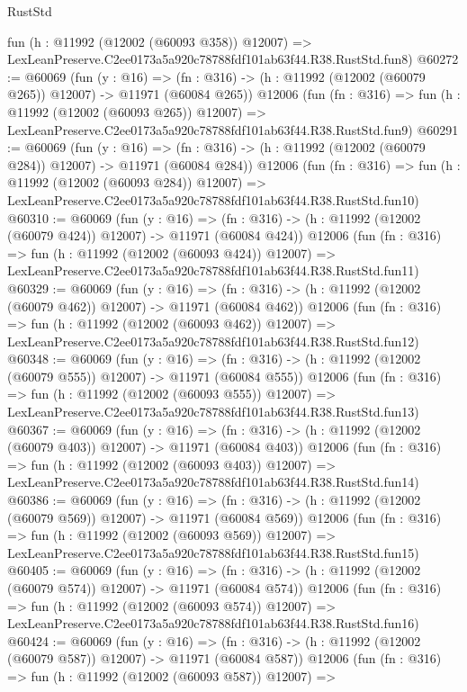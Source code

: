 \begin{lexlean}{RustStd}
\begin{coremodule}
    fun (h : @11992 (@12002 (@60093 @358)) @12007) =>
    LexLeanPreserve.C2ee0173a5a920c78788fdf101ab63f44.R38.RustStd.fun8)
@60272 := @60069
    (fun (y : @16) =>
    (fn : @316) -> (h : @11992 (@12002 (@60079 @265)) @12007) -> @11971 (@60084 @265))
    @12006
    (fun (fn : @316) =>
    fun (h : @11992 (@12002 (@60093 @265)) @12007) =>
    LexLeanPreserve.C2ee0173a5a920c78788fdf101ab63f44.R38.RustStd.fun9)
@60291 := @60069
    (fun (y : @16) =>
    (fn : @316) -> (h : @11992 (@12002 (@60079 @284)) @12007) -> @11971 (@60084 @284))
    @12006
    (fun (fn : @316) =>
    fun (h : @11992 (@12002 (@60093 @284)) @12007) =>
    LexLeanPreserve.C2ee0173a5a920c78788fdf101ab63f44.R38.RustStd.fun10)
@60310 := @60069
    (fun (y : @16) =>
    (fn : @316) -> (h : @11992 (@12002 (@60079 @424)) @12007) -> @11971 (@60084 @424))
    @12006
    (fun (fn : @316) =>
    fun (h : @11992 (@12002 (@60093 @424)) @12007) =>
    LexLeanPreserve.C2ee0173a5a920c78788fdf101ab63f44.R38.RustStd.fun11)
@60329 := @60069
    (fun (y : @16) =>
    (fn : @316) -> (h : @11992 (@12002 (@60079 @462)) @12007) -> @11971 (@60084 @462))
    @12006
    (fun (fn : @316) =>
    fun (h : @11992 (@12002 (@60093 @462)) @12007) =>
    LexLeanPreserve.C2ee0173a5a920c78788fdf101ab63f44.R38.RustStd.fun12)
@60348 := @60069
    (fun (y : @16) =>
    (fn : @316) -> (h : @11992 (@12002 (@60079 @555)) @12007) -> @11971 (@60084 @555))
    @12006
    (fun (fn : @316) =>
    fun (h : @11992 (@12002 (@60093 @555)) @12007) =>
    LexLeanPreserve.C2ee0173a5a920c78788fdf101ab63f44.R38.RustStd.fun13)
@60367 := @60069
    (fun (y : @16) =>
    (fn : @316) -> (h : @11992 (@12002 (@60079 @403)) @12007) -> @11971 (@60084 @403))
    @12006
    (fun (fn : @316) =>
    fun (h : @11992 (@12002 (@60093 @403)) @12007) =>
    LexLeanPreserve.C2ee0173a5a920c78788fdf101ab63f44.R38.RustStd.fun14)
@60386 := @60069
    (fun (y : @16) =>
    (fn : @316) -> (h : @11992 (@12002 (@60079 @569)) @12007) -> @11971 (@60084 @569))
    @12006
    (fun (fn : @316) =>
    fun (h : @11992 (@12002 (@60093 @569)) @12007) =>
    LexLeanPreserve.C2ee0173a5a920c78788fdf101ab63f44.R38.RustStd.fun15)
@60405 := @60069
    (fun (y : @16) =>
    (fn : @316) -> (h : @11992 (@12002 (@60079 @574)) @12007) -> @11971 (@60084 @574))
    @12006
    (fun (fn : @316) =>
    fun (h : @11992 (@12002 (@60093 @574)) @12007) =>
    LexLeanPreserve.C2ee0173a5a920c78788fdf101ab63f44.R38.RustStd.fun16)
@60424 := @60069
    (fun (y : @16) =>
    (fn : @316) -> (h : @11992 (@12002 (@60079 @587)) @12007) -> @11971 (@60084 @587))
    @12006
    (fun (fn : @316) =>
    fun (h : @11992 (@12002 (@60093 @587)) @12007) =>

\end{coremodule}
\end{lexlean}
